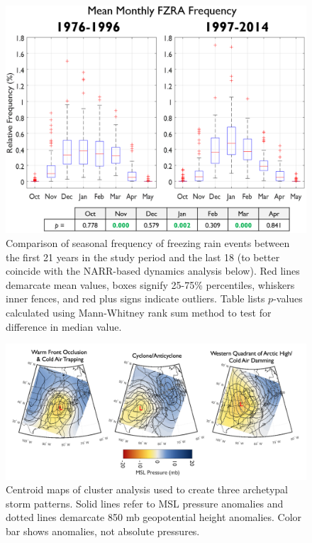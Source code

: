 \documentclass[twocol]{ametsoc}
\begin{document}
\begin{figure}
\centering
\includegraphics[width=.9\textwidth]{Seasonal.PNG}
\caption{\label{fig:seasonal} Comparison of seasonal frequency of freezing rain events between the first 21 years in the study period and the last 18 (to better coincide with the NARR-based dynamics analysis below). Red lines demarcate mean values, boxes signify 25-75\% percentiles, whiskers inner fences, and red plus signs indicate outliers. Table lists $p$-values calculated using Mann-Whitney rank sum method to test for difference in median value.}
\end{figure}

\begin{figure}
\centering
\includegraphics[width=1\textwidth]{Cluster_Centroids.png}
\caption{\label{fig:centroids} Centroid maps of cluster analysis  used to create three archetypal storm patterns. Solid lines refer to MSL pressure anomalies and dotted lines demarcate 850 mb geopotential height anomalies. Color bar shows anomalies, not absolute pressures.}
\end{figure}
\end{document}
